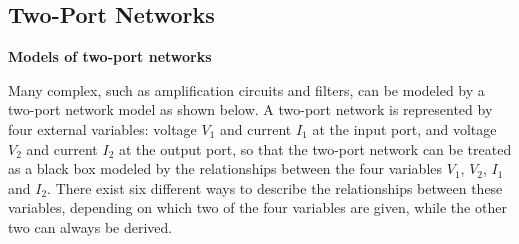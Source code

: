 \documentclass{article}
\begin{document}


\begin{comment}
\begin{itemize}
\item $I_2$ goes through $R_4$ alone with a voltage drop $R_4I_2=10V$.
\item $I_1$ splits between two parallel branches $R_2=15\Omega$ and 
  $R_1+R_3=21\Omega$. The current through $R_1$ is 
  \begin{equation}
    I=I_1\frac{R_2}{R_1+R_2+R_3}=\frac{2\times 15}{15+21}=\frac{5}{6}A
  \end{equation}
\item Voltage drop across $R_1$ is $R_1I=5V$.
\item The open-circuit voltage across the output port is
  $V_T=V_{oc}=10+5+6-9=12V$.
\item The total resistance between the two terminals is
  $R_T=R_{eq}=R_4+R_1||(R_2+R_3)=10+6||(15+15)=15\Omega$.
\end{itemize}
\end{comment}

\subsection*{Two-Port Networks}

{\bf Models of two-port networks}

Many complex, such as amplification circuits and filters, can be modeled
by a two-port network model as shown below. A two-port network is 
represented by four external variables: voltage $V_1$ and current $I_1$ 
at the input port, and voltage $V_2$ and current $I_2$ at the output port, 
so that the two-port network can be treated as a black box modeled by the
relationships between the four variables $V_1$, $V_2$, $I_1$ and $I_2$.
There exist six different ways to describe the relationships between these 
variables, depending on which two of the four variables are given, while 
the other two can always be derived. 

\begin{comment}
{\bf Note: } All voltages and currents below are complex variables and
represented by phasors containing both magnitude and phase angle. However, 
for convenience the phasor notation $\dot{V}$ and $\dot{I}$ are replaced by 
$V$ and $I$ respectively.
\end{comment}
\end{document}
